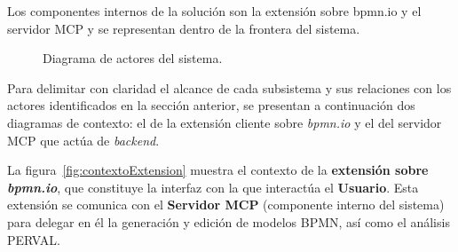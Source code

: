 {Los componentes internos de la solución son la extensión sobre bpmn.io y el servidor MCP y se representan dentro de la frontera del sistema.

\begin{figure}[h!]
\centering
{}
\caption{Diagrama de actores del sistema.}
\label{fig:diagramaActores}
\end{figure}

\label{subsec:diagramasContexto}

Para delimitar con claridad el alcance de cada subsistema y sus relaciones con los actores identificados en la sección anterior, se presentan a continuación dos diagramas de contexto: el de la extensión cliente sobre \textit{bpmn.io} y el del servidor MCP que actúa de \textit{backend}.


La figura~\ref{fig:contextoExtension} muestra el contexto de la \textbf{extensión sobre \textit{bpmn.io}}, que constituye la interfaz con la que interactúa el \textbf{Usuario}. Esta extensión se comunica con el \textbf{Servidor MCP} (componente interno del sistema) para delegar en él la generación y edición de modelos BPMN, así como el análisis PERVAL.


\begin{figure}[h!]
\centering
\begin{tikzpicture}[
  sysbox/.style={draw, thick, rectangle, minimum width=5.2cm, minimum height=2cm, align=center, fill=gray!8},
  extbox/.style={draw, thick, rectangle, minimum width=3.6cm, minimum height=1.6cm, align=center},
  >=Stealth, line width=0.8pt
]


\end{tikzpicture}
\end{figure}}
